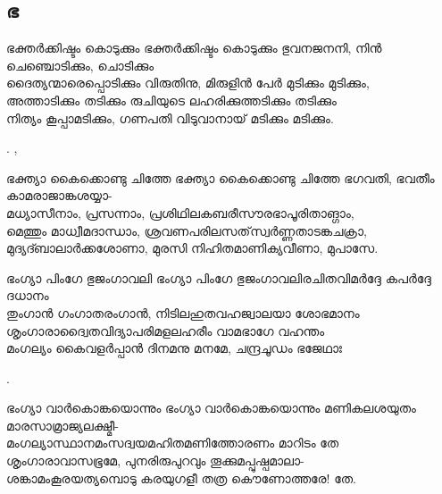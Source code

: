 \subsection{ഭ}

\begin{enumerate}

\begin{slokam}{\VSr}{\SVL}{ഭക്തർക്കിഷ്ടം കൊടുക്കും}
ഭക്തർക്കിഷ്ടം കൊടുക്കും ഭുവനജനനി, നിൻ ചെഞ്ചൊടിക്കും, ചൊടിക്കും\\
ദൈത്യന്മാരെപ്പൊടിക്കും വിരുതിനു, മിരുളിൻ പേർ മുടിക്കും മുടിക്കും,\\
അത്താടിക്കും തടിക്കും രുചിയുടെ ലഹരിക്കുത്തടിക്കും തടിക്കും\\
നിത്യം കൂപ്പാമടിക്കും, ഗണപതി വിടുവാനായ്‌ മടിക്കും മടിക്കും.
\end{slokam}


.  ,


\begin{slokam}{\VSr}{\Unk}{ഭക്ത്യാ കൈക്കൊണ്ടു ചിത്തേ}
ഭക്ത്യാ കൈക്കൊണ്ടു ചിത്തേ ഭഗവതി, ഭവതീം കാമരാജാങ്കശയ്യാ-\\
മധ്യാസീനാം, പ്രസന്നാം, പ്രശിഥിലകബരീസൗരഭാപൂരിതാങ്ഗാം,\\
മെത്തും മാധ്വീമദാന്ധാം, ശ്രവണപരിലസത്‌സ്വർണ്ണതാടങ്കചക്രാ,\\
മുദ്യദ്ബാലാർക്കശോണാ, മുരസി നിഹിതമാണിക്യവീണാ, മുപാസേ.
\end{slokam}


\begin{slokam}{\VSr}{\Mazha}{ഭംഗ്യാ പിംഗേ ഭുജംഗാവലി}
ഭംഗ്യാ പിംഗേ ഭുജംഗാവലിരചിതവിമർദ്ദേ കപർദ്ദേ ദധാനം\\
തുംഗാൻ ഗംഗാതരംഗാൻ, നിടിലഹുതവഹജ്വാലയാ ശോഭമാനം\\
ശൃംഗാരാദ്വൈതവിദ്യാപരിമളലഹരീം വാമഭാഗേ വഹന്തം\\
മംഗല്യം കൈവളർപ്പാൻ ദിനമനു മനമേ, ചന്ദ്രചൂഡം ഭജേഥാഃ
\end{slokam}


.


\begin{slokam}{\VSr}{\Unk}{ഭംഗ്യാ വാർകൊങ്കയൊന്നും}
ഭംഗ്യാ വാർകൊങ്കയൊന്നും മണികലശയുതം മാരസാമ്രാജ്യലക്ഷ്മീ-\\
മംഗല്യാസ്ഥാനമംസദ്വയമഹിതമണിത്തോരണം മാറിടം തേ\\
ശൃംഗാരാവാസഭൂമേ, പുനരിരുപുറവും തൂക്കുമപ്പുഷ്പമാലാ-\\
ശങ്കാമംകൂരയത്യമ്പൊടു കരയുഗളീ തത്ര കൌണോത്തരേ! തേ.
\end{slokam}


\end{enumerate}
